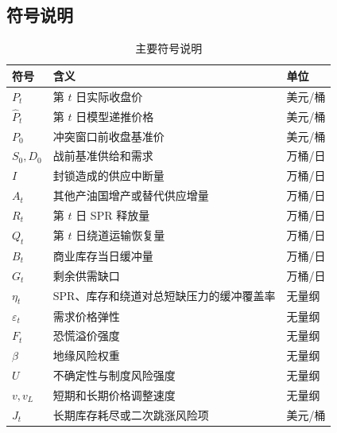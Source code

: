 \subsection{符号说明}

\begin{table}[!htbp]
\centering
\caption{主要符号说明}
\begin{tabularx}{\linewidth}{lXl}
\toprule
符号 & 含义 & 单位 \\
\midrule
$P_t$ & 第 $t$ 日实际收盘价 & 美元/桶 \\
$\hat P_t$ & 第 $t$ 日模型递推价格 & 美元/桶 \\
$P_0$ & 冲突窗口前收盘基准价 & 美元/桶 \\
$S_0,D_0$ & 战前基准供给和需求 & 万桶/日 \\
$I$ & 封锁造成的供应中断量 & 万桶/日 \\
$A_t$ & 其他产油国增产或替代供应增量 & 万桶/日 \\
$R_t$ & 第 $t$ 日 SPR 释放量 & 万桶/日 \\
$Q_t$ & 第 $t$ 日绕道运输恢复量 & 万桶/日 \\
$B_t$ & 商业库存当日缓冲量 & 万桶/日 \\
$G_t$ & 剩余供需缺口 & 万桶/日 \\
$\eta_t$ & SPR、库存和绕道对总短缺压力的缓冲覆盖率 & 无量纲 \\
$\varepsilon_t$ & 需求价格弹性 & 无量纲 \\
$F_t$ & 恐慌溢价强度 & 无量纲 \\
$\beta$ & 地缘风险权重 & 无量纲 \\
$U$ & 不确定性与制度风险强度 & 无量纲 \\
$v,v_L$ & 短期和长期价格调整速度 & 无量纲 \\
$J_t$ & 长期库存耗尽或二次跳涨风险项 & 美元/桶 \\
\bottomrule
\end{tabularx}
\end{table}
